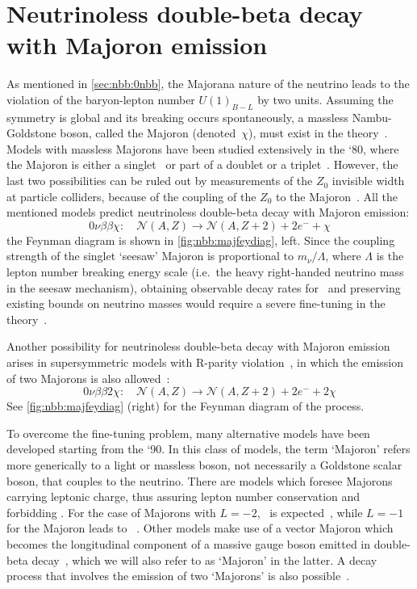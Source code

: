 \section{Neutrinoless double-beta decay with Majoron emission}

As mentioned in \cref{sec:nbb:0nbb}, the Majorana nature of the neutrino leads
to the violation of the baryon-lepton number $U(1)_{B-L}$ by two units.
Assuming the symmetry is global and its breaking occurs spontaneously, a
massless Nambu-Goldstone boson, called the Majoron (denoted~$\chi$), must exist
in the theory~\cite{Chikashige1981, Schechter1982, Gelmini1981, Georgi1981,
Mohpatra2004}.  Models with massless Majorons have been studied extensively in
the `80, where the Majoron is either a singlet~\cite{Chikashige1981} or part of
a doublet or a triplet~\cite{Gelmini1981, Georgi1981}. However, the last two
possibilities can be ruled out by measurements of the $Z_0$ invisible width at
particle colliders, because of the coupling of the $Z_0$ to the
Majoron~\cite{Berezhiani1992}. All the mentioned models predict neutrinoless
double-beta decay with Majoron emission:
\[
  0\nu\beta\beta\chi:\quad
    \mathcal{N}(A,Z) \longrightarrow \mathcal{N}(A,Z+2) + 2e^- + \chi
\]
the Feynman diagram is shown in \cref{fig:nbb:majfeydiag}, left. Since the
coupling strength of the singlet `seesaw' Majoron is proportional to $m_\nu /
\Lambda$, where $\Lambda$ is the lepton number breaking energy scale (i.e.~the
heavy right-handed neutrino mass in the seesaw mechanism), obtaining observable
decay rates for \onbbx\ and preserving existing bounds on neutrino masses would
require a severe fine-tuning in the theory~\cite{Burgess1993, Burgess1994}.

Another possibility for neutrinoless double-beta decay with Majoron emission
arises in supersymmetric models with R-parity violation~\cite{Masiero1990,
Mohpatra2004}, in which the emission of two Majorons is also
allowed~\cite{Mohpatra1988}:
\[
  0\nu\beta\beta2\chi:\quad
    \mathcal{N}(A,Z) \longrightarrow \mathcal{N}(A,Z+2) + 2e^- + 2\chi
\]
See \cref{fig:nbb:majfeydiag} (right) for the Feynman diagram of the process.

To overcome the fine-tuning problem, many alternative models have been
developed starting from the `90. In this class of models, the term `Majoron'
refers more generically to a light or massless boson, not necessarily a
Goldstone scalar boson, that couples to the neutrino. There are models which
foresee Majorons carrying leptonic charge, thus assuring lepton number
conservation and forbidding \onbb. For the case of Majorons with $L = −2$,
\onbbx\ is expected~\cite{Burgess1993}, while $L = −1$ for the Majoron leads to
\onbbxx~\cite{Burgess1994}. Other models make use of a vector Majoron which
becomes the longitudinal component of a massive gauge boson emitted in
double-beta decay~\cite{Carone1993}, which we will also refer to as `Majoron'
in the latter. A decay process that involves the emission of two `Majorons' is
also possible~\cite{Bamert1995}.

